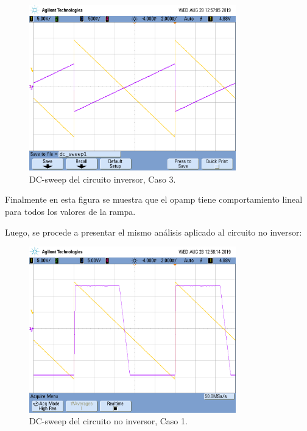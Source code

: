 \begin{figure}[H]	
	\centering
	\includegraphics[width=0.8\textwidth, trim = {0 3.3cm 0 2cm},clip]{Ejercicio1/Imagenes/dc_sweep_c3.png}
	\caption{DC-sweep del circuito inversor, Caso 3.}
	\label{fig:dcc3}
\end{figure} 
Finalmente en esta figura se muestra que el opamp tiene comportamiento lineal para todos los valores de la rampa.

Luego, se procede a presentar el mismo análisis aplicado al circuito no inversor:

\begin{figure}[H]	
	\centering
	\includegraphics[width=0.8\textwidth, trim = {0 3.3cm 0 2cm},clip]{Ejercicio1/Imagenes/dc_sweep_c1_noinv.png}
	\caption{DC-sweep del circuito no inversor, Caso 1.}
	\label{fig:dcc1noi}
\end{figure} 

